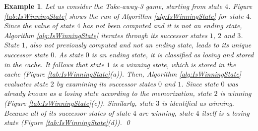 \documentclass[review]{elsarticle}
\newcommand{\true}{\top}
\newcommand{\false}{\bot}
\newtheorem{example}{Example}
\begin{document}
		\begin{example}\label{exm:IsWinningState} \rm
				Let us consider the Take-away-3 game, starting from state $4$.
				Figure \ref{tab:IsWinningState} shows the run of Algorithm \ref{alg:IsWinningState} for state $4$.
				Since the value of state $4$ has not been computed and it is not an ending state, Algorithm \ref{alg:IsWinningState} iterates through its successor states $1$, $2$ and $3$.
				State $1$, also not previously computed and not an ending state, leads to its unique successor state $0$.
				As state $0$ is an ending state, it is classified as losing and stored in the cache. %
				It follows that state $1$ is a winning state, which is stored in the cache (Figure \ref{tab:IsWinningState}(a)).
				Then, Algorithm \ref{alg:IsWinningState} evaluates state $2$ by examining its successor states $0$ and $1$.
				Since state $0$ was already known as a losing state according to the memorization, state $2$ is winning (Figure \ref{tab:IsWinningState}(c)).
				Similarly, state $3$ is identified as winning.
				Because all of its successor states of state $4$ are winning, state $4$ itself is a losing state (Figure \ref{tab:IsWinningState}(d)). \qed					
%			
    	\end{example}
\end{document}
